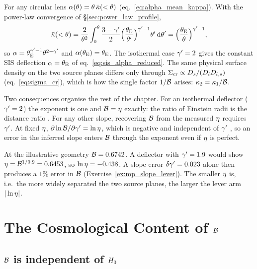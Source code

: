 \begin{bridge}
For any circular lens $\alpha(\theta)=\theta\,\bar{\kappa}(<\theta)$
(eq.~\eqref{eq:alpha_mean_kappa}).  With the power-law convergence of
\S\ref{sec:power_law_profile},
\[
  \bar{\kappa}(<\theta)=\frac{2}{\theta^2}\int_0^\theta
  \frac{3-\gamma'}{2}\Big(\frac{\theta_{\mathrm{E}}}{\theta'}\Big)^{\gamma'-1}\theta'\,\dd\theta'
  =\Big(\frac{\theta_{\mathrm{E}}}{\theta}\Big)^{\gamma'-1},
\]
so $\alpha=\theta_{\mathrm{E}}^{\gamma'-1}\theta^{2-\gamma'}$ and $\alpha(\theta_{\mathrm{E}})=\theta_{\mathrm{E}}$.
The isothermal case $\gamma'=2$ gives the constant SIS deflection
$\alpha=\theta_{\mathrm{E}}$ of eq.~\eqref{eq:sis_alpha_reduced}.  The same
physical surface density on the two source planes differs only through
$\Sigma_{\mathrm{cr}}\propto D_s/(D_l D_{l,s})$ (eq.~\eqref{eq:sigma_cr}), which is
how the single factor $1/\mathcal{B}$ arises: $\kappa_2=\kappa_1/\mathcal{B}$.
\end{bridge}

Two consequences organise the rest of the chapter.  For an isothermal
deflector ($\gamma'=2$) the exponent is one and $\mathcal{B}=\eta$ exactly: the
ratio of Einstein radii is the distance ratio .  For any
other slope, recovering $\mathcal{B}$ from the measured $\eta$ requires
$\gamma'$.  At fixed $\eta$, $\partial\ln\mathcal{B}/\partial\gamma'=\ln\eta$,
which is negative and independent of $\gamma'$ , so an error
in the inferred slope enters $\mathcal{B}$ through the exponent even if
$\eta$ is perfect.

\begin{annotation}
At the illustrative geometry $\mathcal{B}=0.6742$.  A deflector with
$\gamma'=1.9$ would show $\eta=\mathcal{B}^{1/0.9}=0.6453$, so
$\ln\eta=-0.438$.  A slope error $\delta\gamma'=0.023$ alone then
produces a $1\%$ error in $\mathcal{B}$ (Exercise~\ref{ex:mp_slope_lever}).
The smaller $\eta$ is, i.e.\ the more widely separated the two source
planes, the larger the lever arm $|\ln\eta|$.
\end{annotation}


\section{The Cosmological Content of $\mathcal{B}$}
\label{sec:mp_cosmo}

\subsection{$\mathcal{B}$ is independent of $H_0$}

